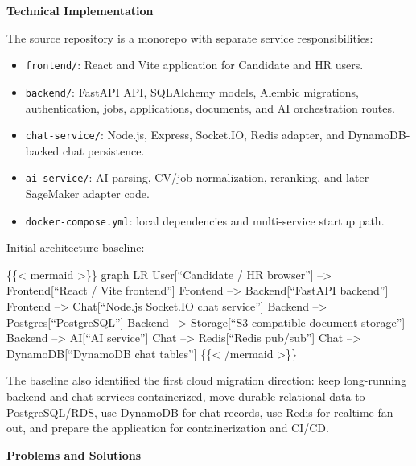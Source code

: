 \vspace{0.5em}\noindent\textbf{Technical Implementation}\par

The source repository is a monorepo with separate service
responsibilities:

\begin{itemize}
\tightlist
\item
  \texttt{frontend/\allowbreak{}}: React and Vite application for Candidate and HR
  users.
\item
  \texttt{backend/\allowbreak{}}: FastAPI API, SQLAlchemy models, Alembic migrations,
  authentication, jobs, applications, documents, and AI orchestration
  routes.
\item
  \texttt{chat-\allowbreak{}service/\allowbreak{}}: Node.js, Express, Socket.IO, Redis adapter,
  and DynamoDB-backed chat persistence.
\item
  \texttt{ai\_\allowbreak{}service/\allowbreak{}}: AI parsing, CV/job normalization, reranking,
  and later SageMaker adapter code.
\item
  \texttt{docker-\allowbreak{}compose.\allowbreak{}yml}: local dependencies and multi-service
  startup path.
\end{itemize}

Initial architecture baseline:

\{\{\textless{} mermaid \textgreater\}\} graph LR User{[}``Candidate /
HR browser''{]} --\textgreater{} Frontend{[}``React / Vite frontend''{]}
Frontend --\textgreater{} Backend{[}``FastAPI backend''{]} Frontend
--\textgreater{} Chat{[}``Node.js Socket.IO chat service''{]} Backend
--\textgreater{} Postgres{[}``PostgreSQL''{]} Backend --\textgreater{}
Storage{[}``S3-compatible document storage''{]} Backend --\textgreater{}
AI{[}``AI service''{]} Chat --\textgreater{} Redis{[}``Redis
pub/sub''{]} Chat --\textgreater{} DynamoDB{[}``DynamoDB chat
tables''{]} \{\{\textless{} /mermaid \textgreater\}\}

The baseline also identified the first cloud migration direction: keep
long-running backend and chat services containerized, move durable
relational data to PostgreSQL/RDS, use DynamoDB for chat records, use
Redis for realtime fan-out, and prepare the application for
containerization and CI/CD.

\vspace{0.5em}\noindent\textbf{Problems and Solutions}\par

